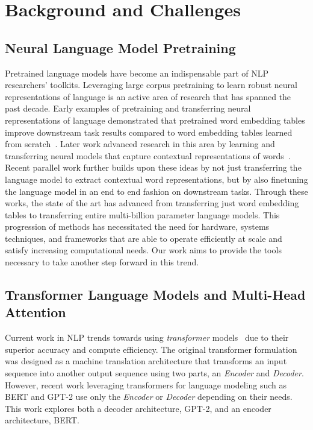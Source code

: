 \section{Background and Challenges}
\subsection{Neural Language Model Pretraining} 

Pretrained language models have become an indispensable part of NLP researchers' toolkits. Leveraging large corpus pretraining to learn robust neural representations of language is an active area of research that has spanned the past decade. Early examples of pretraining and transferring neural representations of language demonstrated that pretrained word embedding tables improve downstream task results compared to word embedding tables learned from scratch~\cite{Mikolov2013,Pennington2014,Turian2010}. 
Later work advanced research in this area by learning and transferring neural models that capture contextual representations of words~\citep{context2vec, Cove, ELMo, Radford2017Sentiment, Radford2019GPT2}. Recent parallel work \citep{Le2016seq2seqtransfer, Howard2018ULMFIT, Radford2018GPT, devlin2018bert, roberta, transformerxl,xlnet,mtdnn,ALBERT2019} further builds upon these ideas by not just transferring the language model to extract contextual word representations, but by also finetuning the language model in an end to end fashion on downstream tasks. Through these works, the state of the art has advanced from transferring just word embedding tables to transferring entire multi-billion parameter language models. This progression of methods has necessitated the need for hardware, systems techniques, and frameworks that are able to operate efficiently at scale and satisfy increasing computational needs. Our work aims to provide the tools necessary to take another step forward in this trend.

\subsection{Transformer Language Models and Multi-Head Attention} 

Current work in NLP trends towards using {\it transformer} models~\cite{Transformer} due to their superior accuracy and compute efficiency. The original transformer formulation was designed as a machine translation architecture that transforms an input sequence into another output sequence using two parts, an {\it Encoder} and {\it Decoder}. However, recent work leveraging transformers for language modeling such as BERT \cite{devlin2018bert} and GPT-2 \cite{Radford2019GPT2} use only the {\it Encoder} or {\it Decoder} depending on their needs. This work explores both a decoder architecture, GPT-2, and an encoder architecture, BERT. 

